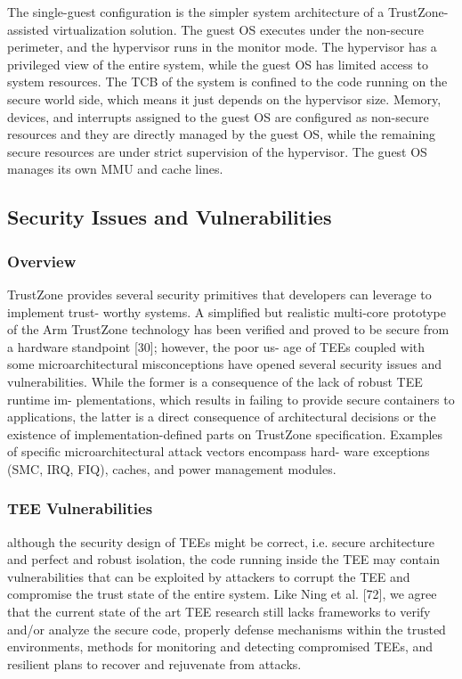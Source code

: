 \documentclass{article}
\begin{document}
The single-guest configuration is the simpler system architecture of a TrustZone-assisted virtualization solution. The guest OS executes under the non-secure perimeter, and the hypervisor runs in the monitor mode. The hypervisor has a privileged view of the entire system, while the guest OS has limited access to system resources. The TCB of the system is confined to the code running on the secure world side, which means it just depends on the hypervisor size. Memory, devices, and interrupts assigned to the guest OS are configured as non-secure resources and they are directly managed by the guest OS, while the remaining secure resources are under strict supervision of the hypervisor. The guest OS manages its own MMU and cache lines.

\subsection{Security Issues and Vulnerabilities}

\subsubsection{Overview}

TrustZone provides several security primitives that developers can leverage to implement trust-
worthy systems. A simplified but realistic multi-core prototype of the Arm TrustZone technology
has been verified and proved to be secure from a hardware standpoint [30]; however, the poor us-
age of TEEs coupled with some microarchitectural misconceptions have opened several security
issues and vulnerabilities. While the former is a consequence of the lack of robust TEE runtime im-
plementations, which results in failing to provide secure containers to applications, the latter is a
direct consequence of architectural decisions or the existence of implementation-defined parts on
TrustZone specification. Examples of specific microarchitectural attack vectors encompass hard-
ware exceptions (SMC, IRQ, FIQ), caches, and power management modules.

\subsubsection{TEE Vulnerabilities}

although the security design of TEEs might be correct, i.e. secure architecture and
perfect and robust isolation, the code running inside the TEE may contain vulnerabilities that
can be exploited by attackers to corrupt the TEE and compromise the trust state of the entire
system. Like Ning et al. [72], we agree that the current state of the art TEE research still lacks
frameworks to verify and/or analyze the secure code, properly defense mechanisms within the
trusted environments, methods for monitoring and detecting compromised TEEs, and resilient
plans to recover and rejuvenate from attacks.
\end{document}
